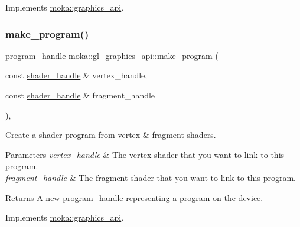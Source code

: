 Implements \mbox{\hyperlink{classmoka_1_1graphics__api_a7c7d927d38be3e441c91a5545b06c779}{moka\+::graphics\+\_\+api}}.

\mbox{\label{classmoka_1_1gl__graphics__api_a41f333c5adcb85036c2d0246a586ec78}} 
\subsubsection{\texorpdfstring{make\_program()}{make\_program()}}
{\footnotesize\ttfamily \mbox{\hyperlink{structmoka_1_1program__handle}{program\+\_\+handle}} moka\+::gl\+\_\+graphics\+\_\+api\+::make\+\_\+program (\begin{DoxyParamCaption}\item[{const \mbox{\hyperlink{structmoka_1_1shader__handle}{shader\+\_\+handle}} \&}]{vertex\+\_\+handle,  }\item[{const \mbox{\hyperlink{structmoka_1_1shader__handle}{shader\+\_\+handle}} \&}]{fragment\+\_\+handle }\end{DoxyParamCaption})\hspace{0.3cm}{\ttfamily [override]}, {\ttfamily [virtual]}}



Create a shader program from vertex \& fragment shaders. 


\begin{DoxyParams}{Parameters}
{\em vertex\+\_\+handle} & The vertex shader that you want to link to this program. \\
\hline
{\em fragment\+\_\+handle} & The fragment shader that you want to link to this program. \\
\hline
\end{DoxyParams}
\begin{DoxyReturn}{Returns}
A new \mbox{\hyperlink{structmoka_1_1program__handle}{program\+\_\+handle}} representing a program on the device. 
\end{DoxyReturn}


Implements \mbox{\hyperlink{classmoka_1_1graphics__api_a8477dfbb8aad44e0828114c68fc21792}{moka\+::graphics\+\_\+api}}.

\mbox{\label{classmoka_1_1gl__graphics__api_a78138ccaae9fe06ea4672dc14a978ed7}} 

